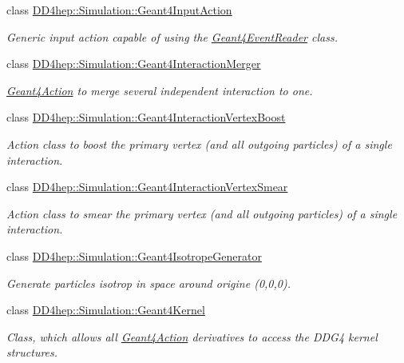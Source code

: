 \begin{DoxyCompactItemize}
class \hyperlink{class_d_d4hep_1_1_simulation_1_1_geant4_input_action}{DD4hep::Simulation::Geant4InputAction}
\begin{DoxyCompactList}\small\item\em Generic input action capable of using the \hyperlink{class_d_d4hep_1_1_simulation_1_1_geant4_event_reader}{Geant4EventReader} class. \item\end{DoxyCompactList}\item 
class \hyperlink{class_d_d4hep_1_1_simulation_1_1_geant4_interaction_merger}{DD4hep::Simulation::Geant4InteractionMerger}
\begin{DoxyCompactList}\small\item\em \hyperlink{class_d_d4hep_1_1_simulation_1_1_geant4_action}{Geant4Action} to merge several independent interaction to one. \item\end{DoxyCompactList}\item 
class \hyperlink{class_d_d4hep_1_1_simulation_1_1_geant4_interaction_vertex_boost}{DD4hep::Simulation::Geant4InteractionVertexBoost}
\begin{DoxyCompactList}\small\item\em Action class to boost the primary vertex (and all outgoing particles) of a single interaction. \item\end{DoxyCompactList}\item 
class \hyperlink{class_d_d4hep_1_1_simulation_1_1_geant4_interaction_vertex_smear}{DD4hep::Simulation::Geant4InteractionVertexSmear}
\begin{DoxyCompactList}\small\item\em Action class to smear the primary vertex (and all outgoing particles) of a single interaction. \item\end{DoxyCompactList}\item 
class \hyperlink{class_d_d4hep_1_1_simulation_1_1_geant4_isotrope_generator}{DD4hep::Simulation::Geant4IsotropeGenerator}
\begin{DoxyCompactList}\small\item\em Generate particles isotrop in space around origine (0,0,0). \item\end{DoxyCompactList}\item 
class \hyperlink{class_d_d4hep_1_1_simulation_1_1_geant4_kernel}{DD4hep::Simulation::Geant4Kernel}
\begin{DoxyCompactList}\small\item\em Class, which allows all \hyperlink{class_d_d4hep_1_1_simulation_1_1_geant4_action}{Geant4Action} derivatives to access the DDG4 kernel structures. \item\end{DoxyCompactList}\item 

\end{DoxyCompactItemize}
